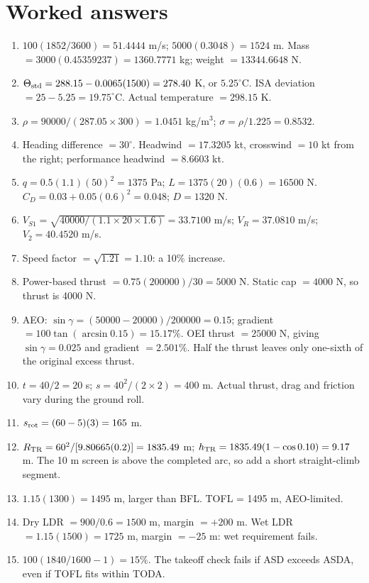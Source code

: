 \documentclass[11pt,letterpaper]{article}
\newcommand{\topic}[1]{\clearpage\section{#1}}
\begin{document}
\topic{Worked answers}
\begin{enumerate}[label=\textbf{\arabic*.}]
\item $100(1852/3600)=51.4444$ m/s; $5000(0.3048)=1524$ m.
Mass $=3000(0.45359237)=1360.7771$ kg; weight $=13344.6648$ N.
\item $\Theta_{\rm std}=288.15-0.0065(1500)=278.40$ K, or $5.25^\circ$C.
ISA deviation $=25-5.25=19.75^\circ$C. Actual temperature $=298.15$ K.
\item $\rho=90000/(287.05\times300)=1.0451$ kg/m$^3$;
$\sigma=\rho/1.225=0.8532$.
\item Heading difference $=30^\circ$.
Headwind $=17.3205$ kt, crosswind $=10$ kt from the right;
performance headwind $=8.6603$ kt.
\item $q=0.5(1.1)(50)^2=1375$ Pa; $L=1375(20)(0.6)=16500$ N.
$C_D=0.03+0.05(0.6)^2=0.048$; $D=1320$ N.
\item $V_{S1}=\sqrt{40000/(1.1\times20\times1.6)}=33.7100$ m/s;
$V_R=37.0810$ m/s; $V_2=40.4520$ m/s.
\item Speed factor $=\sqrt{1.21}=1.10$: a 10\% increase.
\item Power-based thrust $=0.75(200000)/30=5000$ N.
Static cap $=4000$ N, so thrust is 4000 N.
\item AEO: $\sin\gamma=(50000-20000)/200000=0.15$;
gradient $=100\tan(\arcsin0.15)=15.17\%$.
OEI thrust $=25000$ N, giving $\sin\gamma=0.025$ and gradient $=2.501\%$.
Half the thrust leaves only one-sixth of the original excess thrust.
\item $t=40/2=20$ s; $s=40^2/(2\times2)=400$ m.
Actual thrust, drag and friction vary during the ground roll.
\item $s_{\rm rot}=(60-5)(3)=165$ m.
\item $R_{\rm TR}=60^2/[9.80665(0.2)]=1835.49$ m;
$h_{\rm TR}=1835.49(1-\cos0.10)=9.17$ m.
The 10 m screen is above the completed arc, so add a short straight-climb segment.
\item $1.15(1300)=1495$ m, larger than BFL. TOFL = 1495 m, AEO-limited.
\item Dry LDR $=900/0.6=1500$ m, margin $=+200$ m.
Wet LDR $=1.15(1500)=1725$ m, margin $=-25$ m: wet requirement fails.
\item $100(1840/1600-1)=15\%$. The takeoff check fails if ASD exceeds ASDA,
even if TOFL fits within TODA.
\end{enumerate}
\end{document}
